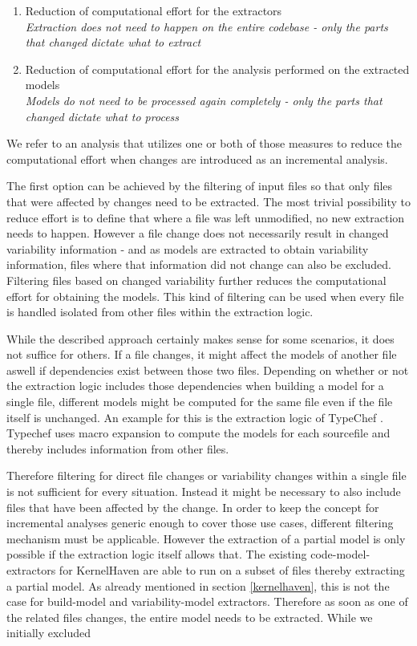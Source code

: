 \documentclass[a4paper]{article}
\begin{document}
\begin{enumerate}
	\item Reduction of computational effort for the extractors \\
	\emph{Extraction does not need to happen on the entire codebase - only the parts that changed dictate what to extract}
	\item Reduction of computational effort for the analysis performed on the extracted models \\
	\emph{Models do not need to be processed again completely - only the parts that changed dictate what to process}
\end{enumerate}

We refer to an analysis that utilizes one or both of those measures to reduce the computational effort when changes are introduced as an incremental analysis.

The first option can be achieved by the filtering of input files so that only files that were affected by changes need to be extracted. The most trivial possibility to reduce effort is to define that where a file was left unmodified, no new extraction needs to happen. 
However a file change does not necessarily result in changed variability information - and as models are extracted to obtain variability information, files where that information did not change can also be excluded. Filtering files based on changed variability further reduces the computational effort for obtaining the models. This kind of filtering can be used when every file is handled isolated from other files within the extraction logic.

While the described approach certainly makes sense for some scenarios, it does not suffice for others. If a file changes, it might affect the models of another file aswell if dependencies exist between those two files. Depending on whether or not the extraction logic includes those dependencies when building a model for a single file, different models might be computed for the same file even if the file itself is unchanged. An example for this is the extraction logic of TypeChef \cite{Kenner:2010:TTT:1868688.1868693}. Typechef uses macro expansion to compute the models for each sourcefile and thereby includes information from other files. 

Therefore filtering for direct file changes or variability changes within a single file is not sufficient for every situation. Instead it might be necessary to also include files that have been affected by the change. In order to keep the concept for incremental analyses generic enough to cover those use cases, different filtering mechanism must be applicable. However the extraction of a partial model is only possible if the extraction logic itself allows that. The existing code-model-extractors for KernelHaven  are able to run on a subset of files thereby extracting a partial model.  As already mentioned in section \ref{kernelhaven}, this is not the case for build-model and variability-model extractors. Therefore as soon as one of the related files changes, the entire model needs to be extracted. While we initially excluded
\end{document}
